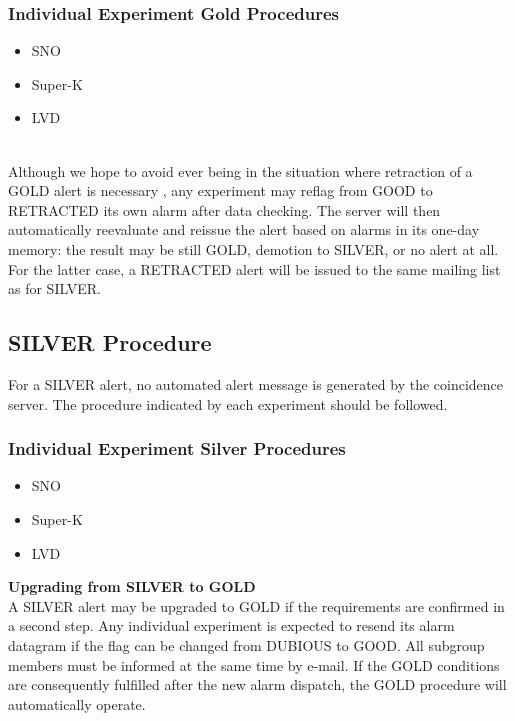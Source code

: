\documentclass{article}
\begin{document}
\subsubsection{Individual Experiment Gold Procedures}

\begin{itemize}

\item SNO
\item Super-K
\item LVD

\end{itemize}


\\ Although we hope
to avoid ever being in the situation where retraction of a GOLD alert
is necessary , any experiment may reflag from GOOD to RETRACTED its
own alarm after data checking.  The server will then automatically
reevaluate and reissue the alert based on alarms in its one-day
memory: the result may be still GOLD, demotion to SILVER, or no alert
at all.  For the latter case, a RETRACTED alert will be issued to the
same mailing list as for SILVER.

\subsection{SILVER Procedure}\label{SILVER}
For a SILVER alert, no automated alert message
is generated by the coincidence server. 
The procedure indicated by each experiment should be followed.\\

\subsubsection{Individual Experiment Silver Procedures}

\begin{itemize}

\item SNO
\item Super-K
\item LVD

\end{itemize}


\noindent \textbf{Upgrading from SILVER to GOLD}\\
A SILVER alert may be upgraded to GOLD if the requirements are
confirmed in a second step. Any individual experiment is expected to
resend its alarm datagram if the flag can be changed from DUBIOUS to
GOOD. All subgroup members must be informed at the same time by
e-mail. If the GOLD conditions are consequently fulfilled after the
new alarm dispatch, the GOLD procedure will automatically operate.
\end{document}
